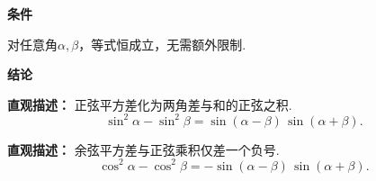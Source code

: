 \begin{statementbox}

\textbf{\textcolor{CStatement}{条件}}
\begin{description}[style=nextline, leftmargin=2.8em, labelsep=0.5em, itemsep=0.35em]
    \item[\textbf{\textcolor{CStatement}{条件 1（任意角）：}}] 对任意角$\alpha,\beta$，等式恒成立，无需额外限制.
\end{description}

\textbf{\textcolor{CStatement}{结论}}
\begin{description}[style=nextline, leftmargin=2.8em, labelsep=0.5em, itemsep=0.45em]
    \item[\textbf{\textcolor{CStatement}{结论一（正弦平方差）：}}]
    \textbf{\textcolor{CStatement}{直观描述：}} 正弦平方差化为两角差与和的正弦之积.
    \[
    \sin^2\alpha - \sin^2\beta = \sin(\alpha-\beta)\,\sin(\alpha+\beta).
    \]

    \item[\textbf{\textcolor{CStatement}{推广结论（余弦平方差）：}}]
    \textbf{\textcolor{CStatement}{直观描述：}} 余弦平方差与正弦乘积仅差一个负号.
    \[
    \cos^2\alpha - \cos^2\beta = -\sin(\alpha-\beta)\,\sin(\alpha+\beta).
    \]
\end{description}

\end{statementbox}
